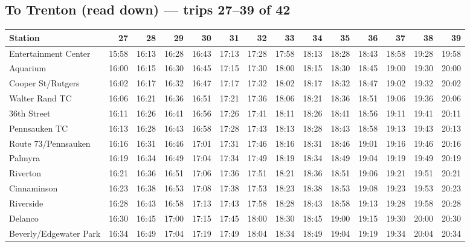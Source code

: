 \subsection*{To Trenton (read down) --- trips 27--39 of 42}
\begin{center}\footnotesize\setlength{\tabcolsep}{3pt}\begin{tabular}{@{}lrrrrrrrrrrrrr@{}}\toprule
Station & 27 & 28 & 29 & 30 & 31 & 32 & 33 & 34 & 35 & 36 & 37 & 38 & 39 \\\midrule
Entertainment Center & 15:58 & 16:13 & 16:28 & 16:43 & 17:13 & 17:28 & 17:58 & 18:13 & 18:28 & 18:43 & 18:58 & 19:28 & 19:58 \\
Aquarium & 16:00 & 16:15 & 16:30 & 16:45 & 17:15 & 17:30 & 18:00 & 18:15 & 18:30 & 18:45 & 19:00 & 19:30 & 20:00 \\
Cooper St/Rutgers & 16:02 & 16:17 & 16:32 & 16:47 & 17:17 & 17:32 & 18:02 & 18:17 & 18:32 & 18:47 & 19:02 & 19:32 & 20:02 \\
Walter Rand TC & 16:06 & 16:21 & 16:36 & 16:51 & 17:21 & 17:36 & 18:06 & 18:21 & 18:36 & 18:51 & 19:06 & 19:36 & 20:06 \\
36th Street & 16:11 & 16:26 & 16:41 & 16:56 & 17:26 & 17:41 & 18:11 & 18:26 & 18:41 & 18:56 & 19:11 & 19:41 & 20:11 \\
Pennsauken TC & 16:13 & 16:28 & 16:43 & 16:58 & 17:28 & 17:43 & 18:13 & 18:28 & 18:43 & 18:58 & 19:13 & 19:43 & 20:13 \\
Route 73/Pennsauken & 16:16 & 16:31 & 16:46 & 17:01 & 17:31 & 17:46 & 18:16 & 18:31 & 18:46 & 19:01 & 19:16 & 19:46 & 20:16 \\
Palmyra & 16:19 & 16:34 & 16:49 & 17:04 & 17:34 & 17:49 & 18:19 & 18:34 & 18:49 & 19:04 & 19:19 & 19:49 & 20:19 \\
Riverton & 16:21 & 16:36 & 16:51 & 17:06 & 17:36 & 17:51 & 18:21 & 18:36 & 18:51 & 19:06 & 19:21 & 19:51 & 20:21 \\
Cinnaminson & 16:23 & 16:38 & 16:53 & 17:08 & 17:38 & 17:53 & 18:23 & 18:38 & 18:53 & 19:08 & 19:23 & 19:53 & 20:23 \\
Riverside & 16:28 & 16:43 & 16:58 & 17:13 & 17:43 & 17:58 & 18:28 & 18:43 & 18:58 & 19:13 & 19:28 & 19:58 & 20:28 \\
Delanco & 16:30 & 16:45 & 17:00 & 17:15 & 17:45 & 18:00 & 18:30 & 18:45 & 19:00 & 19:15 & 19:30 & 20:00 & 20:30 \\
Beverly/Edgewater Park & 16:34 & 16:49 & 17:04 & 17:19 & 17:49 & 18:04 & 18:34 & 18:49 & 19:04 & 19:19 & 19:34 & 20:04 & 20:34 \\

\end{tabular}
\end{center}
